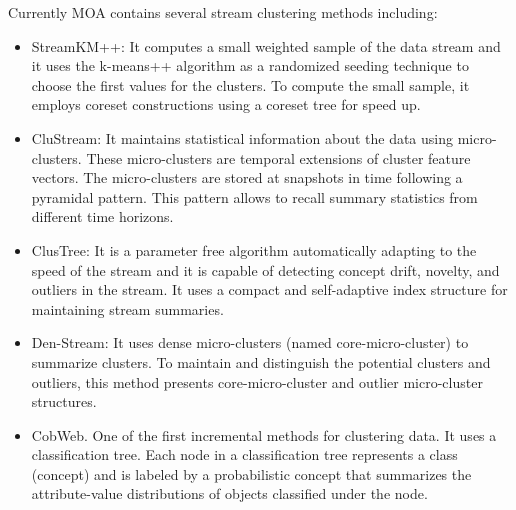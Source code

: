 \documentclass[a4paper,12pt,twoside]{book}
\begin{document}
Currently MOA contains several stream clustering methods including:

\begin{itemize}
	\item StreamKM++: It computes a small weighted sample of the data stream
	 and it uses the k-means++ algorithm as a randomized seeding technique to choose the 
	 first values for the clusters. To compute the small sample, it employs coreset constructions
	 using a coreset tree for speed up. 
	\item CluStream: It maintains statistical information about the data using micro-clusters. These micro-clusters are temporal extensions of cluster feature vectors. The 
	micro-clusters are stored at snapshots in time following a pyramidal pattern. This pattern 
	allows to recall summary statistics from different time horizons. 
	\item ClusTree: It is a parameter free algorithm automatically adapting to the speed of the stream and it is capable of detecting concept drift, novelty, and outliers in the stream. It uses a compact and self-adaptive index structure for maintaining stream summaries.
	\item Den-Stream: It uses dense micro-clusters (named core-micro-cluster) 
	to summarize clusters. To maintain and distinguish the potential clusters and outliers, 
	this method presents core-micro-cluster and outlier micro-cluster structures.
	  \item CobWeb. One of the first incremental methods for clustering data. 
	  It uses a classification tree. Each node in a classification tree represents a class (concept)
	   and is labeled by a probabilistic concept that summarizes the attribute-value distributions
	    of objects classified under the node. 
\end{itemize}
\end{document}
